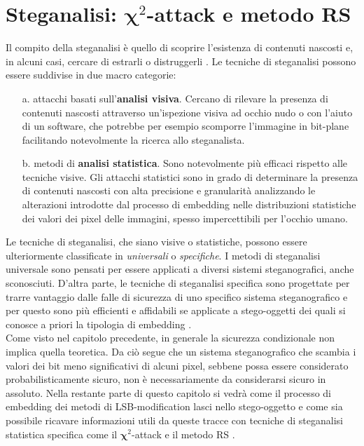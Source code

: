\chapter{Steganalisi: $\mathbf{\chi}^2$-attack e metodo RS}
Il compito della steganalisi è quello di scoprire l'esistenza di contenuti nascosti e, in alcuni casi, cercare di estrarli o distruggerli \cite{warfare}. Le tecniche di steganalisi possono essere suddivise in due macro categorie:
\begin{itemize}
\item[a.] attacchi basati sull'\textbf{analisi visiva}. Cercano di rilevare la presenza di contenuti nascosti attraverso un'ispezione visiva ad occhio nudo o con l'aiuto di un software, che potrebbe per esempio scomporre l'immagine in bit-plane facilitando notevolmente la ricerca allo steganalista.
\item[b.] metodi di \textbf{analisi statistica}. Sono notevolmente più efficaci rispetto alle tecniche visive. Gli attacchi statistici sono in grado di determinare la presenza di contenuti nascosti con alta precisione e granularità analizzando le alterazioni introdotte dal processo di embedding nelle distribuzioni statistiche dei valori dei pixel delle immagini, spesso impercettibili per l'occhio umano.
\end{itemize}
Le tecniche di steganalisi, che siano visive o statistiche, possono essere ulteriormente classificate in \textit{universali} o \textit{specifiche}. I metodi di steganalisi universale sono pensati per essere applicati a diversi sistemi steganografici, anche sconosciuti. D'altra parte, le tecniche di steganalisi specifica sono progettate per trarre vantaggio dalle falle di sicurezza di uno specifico sistema steganografico e per questo sono più efficienti e affidabili se applicate a stego-oggetti dei quali si conosce a priori la tipologia di embedding \cite{survey2}.\\Come visto nel capitolo precedente, in generale la sicurezza condizionale non implica quella teoretica. Da ciò segue che un sistema steganografico che scambia i valori dei bit meno significativi di alcuni pixel, sebbene possa essere considerato probabilisticamente sicuro, non è necessariamente da considerarsi sicuro in assoluto. Nella restante parte di questo capitolo si vedrà come il processo di embedding dei metodi di LSB-modification lasci  nello stego-oggetto \cite{seeingTheUnseen, warfare} e come sia possibile ricavare informazioni utili da queste tracce con tecniche di steganalisi statistica specifica come il $\mathbf{\chi}^2$-attack \cite{chisq} e il metodo RS \cite{fried1, fried2}.  
